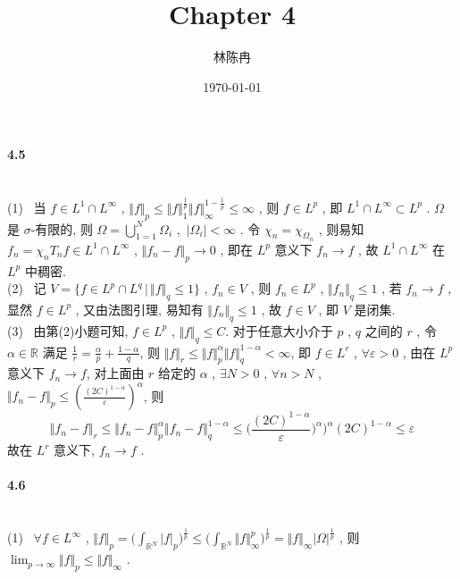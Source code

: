 \documentclass[a4paper, UTF8]{ctexart}				%
\title{Chapter 4}
\author{林陈冉}
\date{\today}
\numberwithin{equation}{section}				%
\begin{document}
	\maketitle										%
	\paragraph{4.5}\quad\\
	\noindent(1) \, 当 $f \in L^1 \cap L^\infty$ ,
	$\Vert{f}\Vert_p \le \Vert{f}\Vert_1^{\frac{1}{p}} \Vert{f}\Vert_\infty^{1-\frac{1}{p}} \le \infty$ ,
	则 $f \in L^p$ ,
	即 $L^1 \cap L^\infty \subset L^p$ . $\Omega$ 是 $\sigma$-有限的,
	则 $\Omega = \bigcup^N_{1 = 1} \Omega_i$ ,\
	$\vert{\Omega_i}\vert < \infty$ .
	令 $\chi_n = \chi_{\Omega_n}$ ,
	则易知 $f_n = \chi_n T_n f \in L^1 \cap L^\infty$ ,
	$\Vert{f_n - f}\Vert_p \rightarrow 0$ ,
	即在 $L^p$ 意义下 $f_n \rightarrow f$ ,
	故 $L^1 \cap L^\infty$ 在 $L^p$ 中稠密.\\
	
	\noindent(2) \, 记 $V = \{f \in L^p \cap L^q \,\big|\, \Vert{f}\Vert_q \le 1\}$ ,
	$f_n \in V$ ,
	则 $f_n \in L^p$ , $\Vert{f_n}\Vert_q \le 1$ ,
	若 $f_n \rightarrow f$ , 显然 $f \in L^p$ ,
	又由法图引理, 易知有 $\Vert{f_n}\Vert_q \le 1$ ,
	故 $f \in V$ , 即 $V$ 是闭集.\\

	\noindent(3) \, 由第(2)小题可知, $f \in L^p$ , $\Vert{f}\Vert_q \le C$.
	对于任意大小介于 $p$ , $q$ 之间的 $r$ , 令 $\alpha \in \mathbb{R}$ 满足 $\frac{1}{r} = \frac{\alpha}{p} + \frac{1 - \alpha}{q}$,
	则 $\Vert{f}\Vert_r \le \Vert{f}\Vert_p^\alpha \Vert{f}\Vert_q^{1 - \alpha} < \infty$,
	即 $f \in L^r$ ,
	$\forall \varepsilon > 0$ , 由在 $L^p$ 意义下 $f_n \rightarrow f$,
	对上面由 $r$ 给定的 $\alpha$ , $\exists N > 0$ , $\forall n > N$ ,
	$\Vert{f_n - f}\Vert_p \le (\frac{(2C)^{1 - \alpha}}{\varepsilon})^\alpha$,
	则 
	\[
		\Vert{f_n - f}\Vert_r \le \Vert{f_n - f}\Vert_p^\alpha \Vert{f_n - f}\Vert_q^{1 - \alpha} \le \Big(\frac{(2C)^{1 - \alpha}}{\varepsilon})^\alpha\Big)^\alpha (2C)^{1 - \alpha} \le \varepsilon
	\]
	故在 $L^r$ 意义下, $f_n \rightarrow f$ .\\

	\paragraph{4.6}\quad\\
	\noindent(1) \, $\forall f \in L^\infty$ , $\Vert{f}\Vert_p = \Big(\int^{ }_{\mathbb{R}^N} \vert{f}\vert_p \Big)^{\frac{1}{p}} \le \Big( \int^{ }_{\mathbb{R}^N} \Vert{f}\Vert_\infty^p \Big)^{\frac{1}{p}} = \Vert{f}\Vert_\infty \vert{\Omega}\vert^{\frac{1}{p}}$ ,
	则 $\lim_{p \rightarrow \infty}\Vert{f}\Vert_p \le \Vert{f}\Vert_\infty$ .
\end{document}
